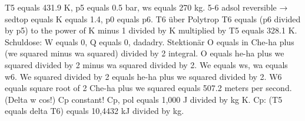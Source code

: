 T5 equals 431.9 K, p5 equals 0.5 bar, ws equals 270 kg.  
5-6 adsol reversible → sedtop equals K equals 1.4, p0 equals p6.  
T6 über Polytrop T6 equals (p6 divided by p5) to the power of K minus 1 divided by K multiplied by T5 equals 328.1 K.  
Schuldose: W equals 0, Q equals 0, dadadry.  
Stektionär O equals in Che-ha plus (we squared minus wa squared) divided by 2 integral.  
O equals he-ha plus we squared divided by 2 minus wa squared divided by 2.  
We equals ws, wa equals w6.  
We squared divided by 2 equals he-ha plus we squared divided by 2.  
W6 equals square root of 2 Che-ha plus we squared equals 507.2 meters per second.  
(Delta w cos!)  
Cp constant!  
Cp, pol equals 1,000 J divided by kg K.  
Cp: (T5 equals delta T6) equals 10,4432 kJ divided by kg.